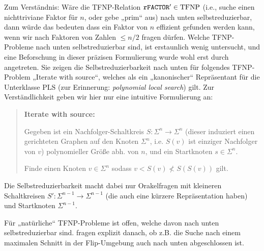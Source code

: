 Zum Verständnis: Wäre die TFNP-Relation $\mathtt{rFACTOR}'\in\mathrm{TFNP}$ (i.e., suche einen nichttriviane Faktor für $n$, oder gebe „prim“ aus) nach unten selbstreduzierbar, dann würde das bedeuten dass ein Faktor von $n$ effizient gefunden werden kann, wenn wir nach Faktoren von Zahlen $\leq n/2$ fragen dürfen.
Welche TFNP-Probleme nach unten selbstreduzierbar sind, ist erstaunlich wenig untersucht, und eine Beforschung in dieser präzisen Formulierung wurde wohl erst durch \textcite{harsha_downward_2023} angetreten.
Sie zeigen die Selbstreduzierbarkeit nach unten für folgendes TFNP-Problem „Iterate with source“, welches als ein „kanonischer“ Repräsentant für die Unterklasse $\mathrm{PLS}$ (zur Erinnerung: \emph{polynomial local search}) gilt. Zur Verständlichkeit geben wir hier nur eine intuitive Formulierung an:
\begin{quote}
    \textbf{Iterate with source:}

    Gegeben ist ein Nachfolger-Schaltkreis $S\colon\Sigma^n\to\Sigma^n$ (dieser induziert einen gerichteten Graphen auf den Knoten $\Sigma^n$, i.e. $S(v)$ ist einziger Nachfolger von $v$) polynomieller Größe abh. von $n$, und  ein Startknoten $s\in\Sigma^n$.

    Finde einen Knoten $v\in\Sigma^n$ sodass $v<S(v)\not < S(S(v))$ gilt.
\end{quote}
Die Selbstreduzierbarkeit macht dabei nur Orakelfragen mit kleineren Schaltkreisen $S'\colon\Sigma^{n-1}\to\Sigma^{n-1}$ (die auch eine kürzere Repräsentation haben) und Startknoten $\Sigma^{n-1}$.

Für „natürliche“  TFNP-Probleme ist offen, welche davon nach unten selbstreduzierbar sind. 
\citeauthor{harsha_downward_2023} fragen explizit danach, ob z.B. die Suche nach einem maximalen Schnitt in der Flip-Umgebung auch nach unten abgeschlossen ist.



